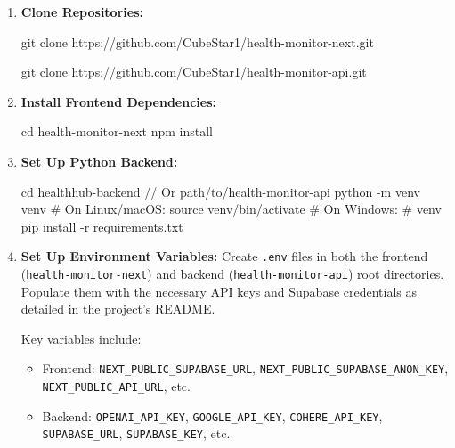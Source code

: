 \begin{enumerate}
    \item \textbf{Clone Repositories:}
    \begin{tcolorbox}[listing engine=listings, colback=black!5!white, colframe=black!75!black, title=Clone Frontend Repository, listings options={breaklines=true, basicstyle=\ttfamily\footnotesize, breakatwhitespace=true, keepspaces=true}]
git clone https://github.com/CubeStar1/health-monitor-next.git
    \end{tcolorbox}
    \begin{tcolorbox}[listing engine=listings, colback=black!5!white, colframe=black!75!black, title=Clone Backend Repository, listings options={breaklines=true, basicstyle=\ttfamily\footnotesize, breakatwhitespace=true, keepspaces=true}]
git clone https://github.com/CubeStar1/health-monitor-api.git
    \end{tcolorbox}

    \item \textbf{Install Frontend Dependencies:}
    \begin{tcolorbox}[listing engine=listings, colback=black!5!white, colframe=black!75!black, title=Install Frontend Dependencies, listings options={breaklines=true, basicstyle=\ttfamily\footnotesize, breakatwhitespace=true, keepspaces=true}]
cd health-monitor-next
npm install
    \end{tcolorbox}

    \item \textbf{Set Up Python Backend:}
    \begin{tcolorbox}[listing engine=listings, colback=black!5!white, colframe=black!75!black, title=Set Up Python Backend, listings options={breaklines=true, basicstyle=\ttfamily\footnotesize, breakatwhitespace=true, keepspaces=true}]
cd healthhub-backend  // Or path/to/health-monitor-api
python -m venv venv
# On Linux/macOS:
source venv/bin/activate
# On Windows:
# venv\Scripts\activate
pip install -r requirements.txt
    \end{tcolorbox}

    \item \textbf{Set Up Environment Variables:}
    Create \texttt{.env} files in both the frontend (\texttt{health-monitor-next}) and backend (\texttt{health-monitor-api}) root directories. Populate them with the necessary API keys and Supabase credentials as detailed in the project's README.
    
    Key variables include:
    \begin{itemize}
        \item Frontend: \texttt{NEXT\_PUBLIC\_SUPABASE\_URL}, \texttt{NEXT\_PUBLIC\_SUPABASE\_ANON\_KEY}, \texttt{NEXT\_PUBLIC\_API\_URL}, etc.
        \item Backend: \texttt{OPENAI\_API\_KEY}, \texttt{GOOGLE\_API\_KEY}, \texttt{COHERE\_API\_KEY}, \texttt{SUPABASE\_URL}, \texttt{SUPABASE\_KEY}, etc.
    \end{itemize}


\end{enumerate}
